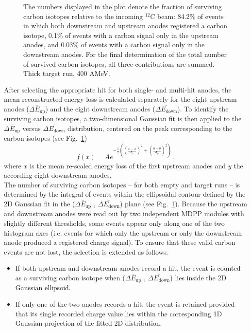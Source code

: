 \begin{figure}[htpb]
{The numbers displayed in the plot denote the fraction of surviving carbon isotopes relative to the incoming $^{12}\mathrm{C}$ beam: 84.2\% of events in which both downstream and upstream anodes registered a carbon isotope, 0.1\% of events with a carbon signal only in the upstream anodes, and 0.03\% of events with a carbon signal only in the downstream anodes. For the final determination of the total number of survived carbon isotopes, all three contributions are summed. Thick target run, 400 AMeV.
    }
    \label{fig:twin_2d_gaus_cut}
\end{figure}
After selecting the appropriate hit for both single- and multi-hit anodes, the mean reconstructed energy loss is calculated separately for the eight upstream anodes ($\overline{\Delta E_{\text{up}}}$) and the eight downstream anodes ($\overline{\Delta E_{\text{down}}}$). To identify the surviving carbon isotopes, a two-dimensional Gaussian fit is then applied to the $\overline{\Delta E_{\text{up}}}$ versus $\overline{\Delta E_{\text{down}}}$ distribution, centered on the peak corresponding to the carbon isotopes (see Fig.~\ref{fig:twin_2d_gaus_cut})
\begin{equation}
f(x) = A e^{-\frac{1}{2}((\frac{x - \bar{x}}{\sigma_{x}})^2 +(\frac{y - \bar{y}}{\sigma_{y}})^2)} \, ,
\label{eq:gauss_fit}
\end{equation}
where $x$ is the mean re-scaled energy loss of the first upstream anodes and $y$ the according eight downstream anodes.\\ 
The number of surviving carbon isotopes -- for both empty and target runs -- is determined by the integral of events within the ellipsoidal contour defined by the 2D Gaussian fit in the ($\overline{\Delta E_{\text{up}}}$ , $\overline{\Delta E_{\text{down}}}$) plane (see Fig.~\ref{fig:twin_2d_gaus_cut}).
Because the upstream and downstream anodes were read out by two independent MDPP modules with slightly different thresholds, some events appear only along one of the two histogram axes (i.e. events for which only the upstream or only the downstream anode produced a registered charge signal). To ensure that these valid carbon events are not lost, the selection is extended as follows:
\begin{itemize}
\item If both upstream and downstream anodes record a hit, the event is counted as a surviving carbon isotope when ($\overline{\Delta E_{\text{up}}}$ , $\overline{\Delta E_{\text{down}}}$) lies inside the 2D Gaussian ellipsoid.
\item If only one of the two anodes records a hit, the event is retained provided that its single recorded charge value lies within the corresponding 1D Gaussian projection of the fitted 2D distribution.
\end{itemize}
